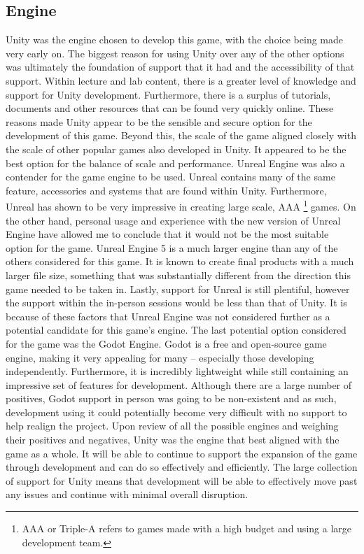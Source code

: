 \documentclass[11pt]{article}
\begin{document}
\subsection{Engine}
Unity was the engine chosen to develop this game, with the choice being made very early on. The biggest reason for using Unity over any of the other options was ultimately the foundation of support that it had and the accessibility of that support. Within lecture and lab content, there is a greater level of knowledge and support for Unity development. Furthermore, there is a surplus of tutorials, documents and other resources that can be found very quickly online. These reasons made Unity appear to be the sensible and secure option for the development of this game. Beyond this, the scale of the game aligned closely with the scale of other popular games also developed in Unity. It appeared to be the best option for the balance of scale and performance. 
Unreal Engine was also a contender for the game engine to be used. Unreal contains many of the same feature, accessories and systems that are found within Unity. Furthermore, Unreal has shown to be very impressive in creating large scale, AAA \footnote{AAA or Triple-A refers to games made with a high budget and using a large development team.} games. On the other hand, personal usage and experience with the new version of Unreal Engine have allowed me to conclude that it would not be the most suitable option for the game. Unreal Engine 5 is a much larger engine than any of the others considered for this game. It is known to create final products with a much larger file size, something that was substantially different from the direction this game needed to be taken in. Lastly, support for Unreal is still plentiful, however the support within the in-person sessions would be less than that of Unity. It is because of these factors that Unreal Engine was not considered further as a potential candidate for this game’s engine.
The last potential option considered for the game was the Godot Engine. Godot is a free and open-source game engine, making it very appealing for many – especially those developing independently. Furthermore, it is incredibly lightweight while still containing an impressive set of features for development. Although there are a large number of positives, Godot support in person was going to be non-existent and as such, development using it could potentially become very difficult with no support to help realign the project. 
Upon review of all the possible engines and weighing their positives and negatives, Unity was the engine that best aligned with the game as a whole. It will be able to continue to support the expansion of the game through development and can do so effectively and efficiently. The large collection of support for Unity means that development will be able to effectively move past any issues and continue with minimal overall disruption. \\
\end{document}
